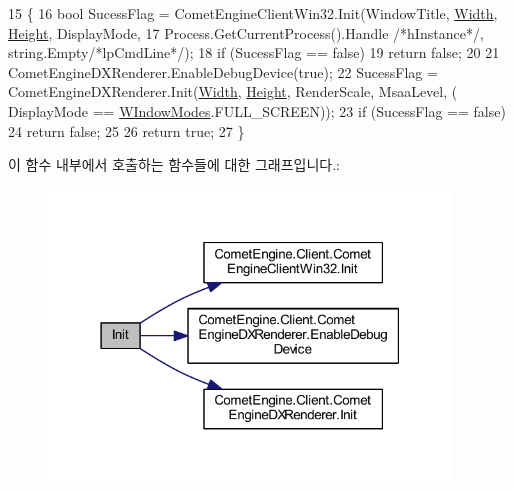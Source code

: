 \begin{DoxyCode}
15         \{
16             \textcolor{keywordtype}{bool} SucessFlag =  CometEngineClientWin32.Init(WindowTitle, \hyperlink{_d_l_l_comet_engine_win32_8cpp_abbe7749c3b402f7dfe64f936774cfcd4}{Width}, 
      \hyperlink{_d_l_l_comet_engine_win32_8cpp_afd53bc431b967813e00ae3cfecd5c548}{Height}, DisplayMode,
17                Process.GetCurrentProcess().Handle \textcolor{comment}{/*hInstance*/}, \textcolor{keywordtype}{string}.Empty\textcolor{comment}{/*lpCmdLine*/});
18             \textcolor{keywordflow}{if} (SucessFlag == \textcolor{keyword}{false})
19                \textcolor{keywordflow}{return} \textcolor{keyword}{false};
20 
21             CometEngineDXRenderer.EnableDebugDevice(\textcolor{keyword}{true});
22             SucessFlag = CometEngineDXRenderer.Init(\hyperlink{_d_l_l_comet_engine_win32_8cpp_abbe7749c3b402f7dfe64f936774cfcd4}{Width}, \hyperlink{_d_l_l_comet_engine_win32_8cpp_afd53bc431b967813e00ae3cfecd5c548}{Height}, RenderScale, MsaaLevel, (
      DisplayMode == \hyperlink{namespace_comet_engine_1_1_client_a608d2e459fd95babca189e50f4182a65}{WIndowModes}.FULL\_SCREEN));
23             \textcolor{keywordflow}{if} (SucessFlag == \textcolor{keyword}{false})
24                 \textcolor{keywordflow}{return} \textcolor{keyword}{false};
25          
26             \textcolor{keywordflow}{return} \textcolor{keyword}{true};
27         \}
\end{DoxyCode}
이 함수 내부에서 호출하는 함수들에 대한 그래프입니다.\+:\nopagebreak
\begin{figure}[H]
\begin{center}
\leavevmode
\includegraphics[width=303pt]{class_comet_engine_1_1_client_1_1_comet_engine_client_af5f8db49a5de5bb41cf935066d21f5aa_cgraph}
\end{center}
\end{figure}

